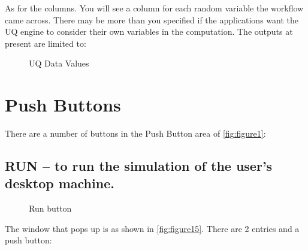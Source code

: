 As for the columns. You will see a column for each random variable the workflow came across. There may be more than you specified if the applications want the 
UQ engine to consider their own variables in the computation. The outputs at present are limited to:



\begin{figure}[!htbp]
  \caption{UQ Data Values}
  \label{fig:figure14}
\end{figure}



\section{Push Buttons}
There are a number of buttons in the Push Button area of \autoref{fig:figure1}:
\subsection{RUN – to run the simulation of the user’s desktop machine.}
\begin{figure}[!htbp]
  \caption{Run button}
  \label{fig:figure15}
\end{figure}
The window that pops up is as shown in \autoref{fig:figure15}. There are 2 entries and a push button: 

